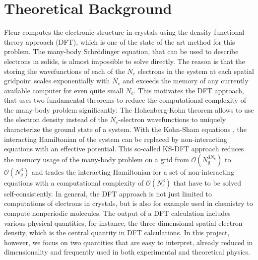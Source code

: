 
\chapter{Theoretical Background}
\label{chap:theory}



Fleur computes the electronic structure in crystals using the density functional theory approach (DFT), which is one of the state of the art method for this problem. The many-body Schrödinger equation, that can be used to describe electrons in solids, is almost impossible to solve directly. The reason is that the storing the wavefunctions of each of the $N_e$ electrons in the system at each spatial gridpoint scales exponentially with $N_e$ and exceeds the memory of any currently available computer for even quite small $N_e$. This motivates the DFT approach, that uses two fundamental theorems to reduce the computational complexity of the many-body problem significantly: The Hohenberg-Kohn theorem \cite{hohenberg-kohn} allows to use the electron density instead of the $N_e$-electron wavefunctions to uniquely characterize the ground state of a system. With the Kohn-Sham equations \cite{kohn-sham}, the interacting Hamiltonian of the system can be replaced by non-interacting equations with an effective potential. This so-called KS-DFT approach reduces the memory usage of the many-body problem on a grid from $\mathcal{O}(N_g^{3 N_e})$ to $\mathcal{O}(N_g^3)$ and trades the interacting Hamiltonian for a set of non-interacting equations with a computational complexity of $\mathcal{O}(N_e^3)$ that have to be solved self-consistently. In general, the DFT approach is not just limited to computations of electrons in crystals, but is also for example used in chemistry to compute nonperiodic molecules.
% 
The output of a DFT calculation includes various physical quantities, for instance, the three-dimensional spatial electron density, which is the central quantity in DFT calculations. In this project, however, we focus on two quantities that are easy to interpret, already reduced in dimensionality and frequently used in both experimental and theoretical physics.

